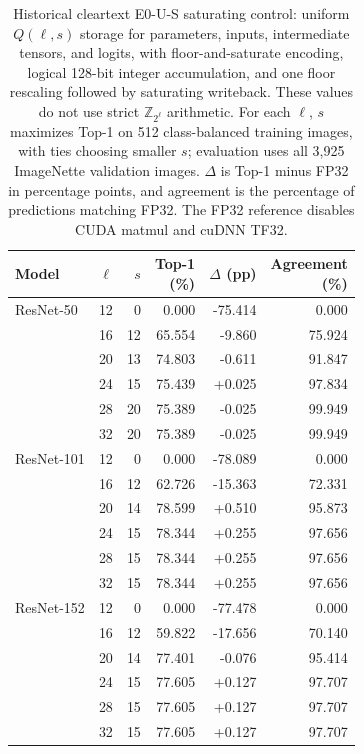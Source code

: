\begin{table}[t]
\centering
\caption{Historical cleartext E0-U-S saturating control: uniform $Q(\ell,s)$ storage for parameters, inputs, intermediate tensors, and logits, with floor-and-saturate encoding, logical 128-bit integer accumulation, and one floor rescaling followed by saturating writeback. These values do not use strict $\mathbb Z_{2^\ell}$ arithmetic. For each $\ell$, $s$ maximizes Top-1 on 512 class-balanced training images, with ties choosing smaller $s$; evaluation uses all 3,925 ImageNette validation images. $\Delta$ is Top-1 minus FP32 in percentage points, and agreement is the percentage of predictions matching FP32. The FP32 reference disables CUDA matmul and cuDNN TF32.}
\label{tab:e0-uniform}
\begingroup
\footnotesize
\setlength{\tabcolsep}{3pt}
\begin{tabular}{lrrrrr}
\toprule
Model & $\ell$ & $s$ & \shortstack{Top-1\\(\%)} & \shortstack{$\Delta$\\(pp)} & \shortstack{Agreement\\(\%)} \\
\midrule
ResNet-50 & 12 & 0 & 0.000 & -75.414 & 0.000 \\
 & 16 & 12 & 65.554 & -9.860 & 75.924 \\
 & 20 & 13 & 74.803 & -0.611 & 91.847 \\
 & 24 & 15 & 75.439 & +0.025 & 97.834 \\
 & 28 & 20 & 75.389 & -0.025 & 99.949 \\
 & 32 & 20 & 75.389 & -0.025 & 99.949 \\
\addlinespace
ResNet-101 & 12 & 0 & 0.000 & -78.089 & 0.000 \\
 & 16 & 12 & 62.726 & -15.363 & 72.331 \\
 & 20 & 14 & 78.599 & +0.510 & 95.873 \\
 & 24 & 15 & 78.344 & +0.255 & 97.656 \\
 & 28 & 15 & 78.344 & +0.255 & 97.656 \\
 & 32 & 15 & 78.344 & +0.255 & 97.656 \\
\addlinespace
ResNet-152 & 12 & 0 & 0.000 & -77.478 & 0.000 \\
 & 16 & 12 & 59.822 & -17.656 & 70.140 \\
 & 20 & 14 & 77.401 & -0.076 & 95.414 \\
 & 24 & 15 & 77.605 & +0.127 & 97.707 \\
 & 28 & 15 & 77.605 & +0.127 & 97.707 \\
 & 32 & 15 & 77.605 & +0.127 & 97.707 \\
\bottomrule
\end{tabular}
\endgroup
\end{table}
